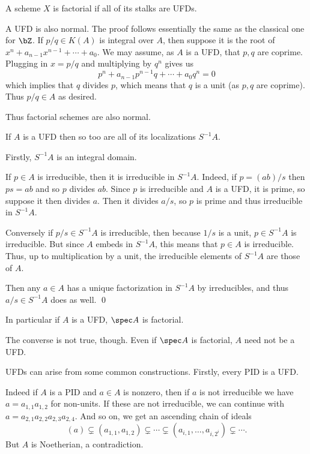     A scheme $X$ is {\emphcolor factorial} if all of its stalks are UFDs.

\edefn

A UFD is also normal.
The proof follows essentially the same as the classical one for $\bZ$.
If $p/q\in K(A)$ is integral over $A$, then suppose it is the root of $x^n+a_{n-1}x^{n-1}+\cdots+a_0$.
We may assume, as $A$ is a UFD, that $p,q$ are coprime.
Plugging in $x=p/q$ and multiplying by $q^n$ gives us
$$ p^n + a_{n-1}p^{n-1}q + \cdots + a_0q^n = 0 $$
which implies that $q$ divides $p$, which means that $q$ is a unit (as $p,q$ are coprime).
Thus $p/q\in A$ as desired.

Thus factorial schemes are also normal.

\blemm

    If $A$ is a UFD then so too are all of its localizations $S^{-1}A$.

\elemm

\bproof

    Firstly, $S^{-1}A$ is an integral domain.

    If $p\in A$ is irreducible, then it is irreducible in $S^{-1}A$.
    Indeed, if $p=(ab)/s$ then $ps=ab$ and so $p$ divides $ab$.
    Since $p$ is irreducible and $A$ is a UFD, it is prime, so suppose it then divides $a$.
    Then it divides $a/s$, so $p$ is prime and thus irreducible in $S^{-1}A$.

    Conversely if $p/s\in S^{-1}A$ is irreducible, then because $1/s$ is a unit, $p\in S^{-1}A$ is irreducible.
    But since $A$ embeds in $S^{-1}A$, this means that $p\in A$ is irreducible.
    Thus, up to multiplication by a unit, the irreducible elements of $S^{-1}A$ are those of $A$.

    Then any $a\in A$ has a unique factorization in $S^{-1}A$ by irreducibles, and thus $a/s\in S^{-1}A$ does as well.
    \qed

\eproof

In particular if $A$ is a UFD, $\spec A$ is factorial.

\bnote

    The converse is not true, though.
    Even if $\spec A$ is factorial, $A$ need not be a UFD.

\enote

\bremark

    UFDs can arise from some common constructions.
    Firstly, every PID is a UFD.

    Indeed if $A$ is a PID and $a\in A$ is nonzero, then if $a$ is not irreducible we have $a=a_{1,1}a_{1,2}$ for non-units.
    If these are not irreducible, we can continue with $a=a_{2,1}a_{2,2}a_{2,3}a_{2,4}$.
    And so on, we get an ascending chain of ideals
    $$ (a) \subsetneq (a_{1,1},a_{1,2}) \subsetneq \cdots \subsetneq (a_{i,1},\dots,a_{i,2^i}) \subsetneq \cdots . $$
    But $A$ is Noetherian, a contradiction.

